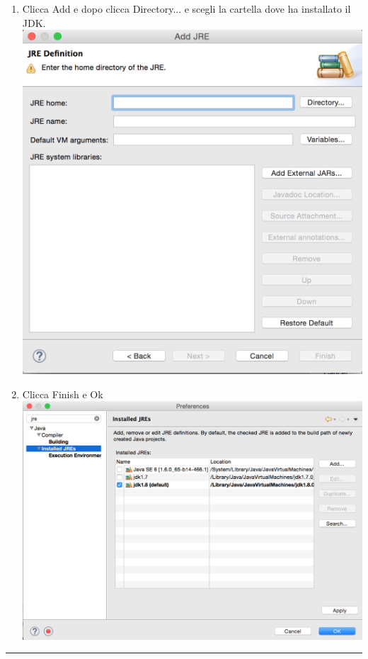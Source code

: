 \documentclass{article}
\begin{document}
\begin{itemize}
\begin{enumerate}
\item Clicca Add e dopo clicca Directory... e scegli la cartella dove
  ha installato il JDK.\\
\includegraphics[scale=0.5]{img/03.png}
\item Clicca Finish e Ok\\
\includegraphics[scale=0.5]{img/04.png}


\end{enumerate}

\end{itemize}
\hrule
\end{document}
